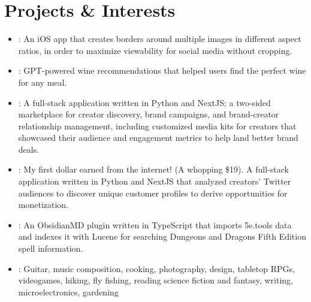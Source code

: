 \documentclass[letterpaper,11pt]{article}
\begin{document}
\section{Projects \& Interests}
\begin{itemize}[leftmargin=0pt]
  \item[]{\href{https://multiborder.io}{}}: An iOS app that creates borders around multiple images in different aspect ratios, in order to maximize viewability for social media without cropping. \\
  \item[]{}: GPT-powered wine recommendations that helped users find the perfect wine for any meal. \\
  \item[]{}: A full-stack application written in Python and NextJS; a two-sided marketplace for creator discovery, brand campaigns, and brand-creator relationship management, including customized media kits for creators that showcased their audience and engagement metrics to help land better brand deals. \\
  \item[]{}: My first dollar earned from the internet! (A whopping \$19). A full-stack application written in Python and NextJS that analyzed creators' Twitter audiences to discover unique customer profiles to derive opportunities for monetization. \\
  \item[]{}: An ObsidianMD plugin written in TypeScript that imports 5e.tools data and indexes it with Lucene for searching Dungeons and Dragons Fifth Edition spell information.  \\
  \item[]{}{}: Guitar, music composition, cooking, photography, design, tabletop RPGs, videogames, hiking, fly fishing, reading science fiction and fantasy, writing, microelectronics, gardening
\end{itemize}

\end{document}
